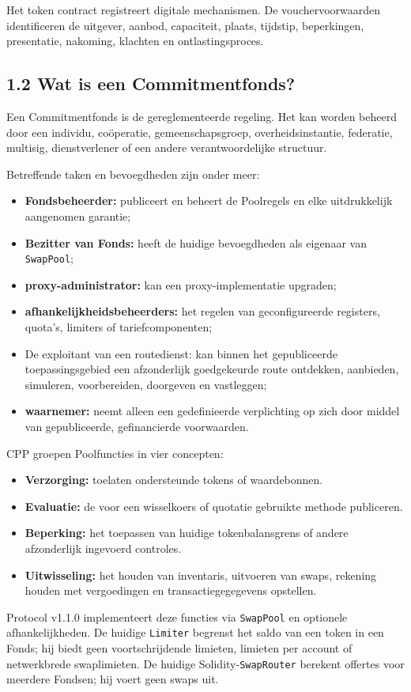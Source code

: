 \documentclass[11pt]{article}
\begin{document}
Het token contract registreert digitale mechanismen. De vouchervoorwaarden identificeren de uitgever, aanbod, capaciteit, plaats, tijdstip, beperkingen, presentatie, nakoming, klachten en ontlastingsproces.

\subsection*{1.2 Wat is een Commitmentfonds?}

Een Commitmentfonds is de gereglementeerde regeling. Het kan worden beheerd door een individu, coöperatie, gemeenschapsgroep, overheidsinstantie, federatie, multisig, dienstverlener of een andere verantwoordelijke structuur.

Betreffende taken en bevoegdheden zijn onder meer:

\begin{itemize}[leftmargin=*]
\item \textbf{Fondsbeheerder:} publiceert en beheert de Poolregels en elke uitdrukkelijk aangenomen garantie;
\item \textbf{Bezitter van Fonds:} heeft de huidige bevoegdheden als eigenaar van \texttt{SwapPool};
\item \textbf{proxy-administrator:} kan een proxy-implementatie upgraden;
\item \textbf{afhankelijkheidsbeheerders:} het regelen van geconfigureerde registers, quota's, limiters of tariefcomponenten;
\item De exploitant van een routedienst: kan binnen het gepubliceerde toepassingsgebied een afzonderlijk goedgekeurde route ontdekken, aanbieden, simuleren, voorbereiden, doorgeven en vastleggen;
\item \textbf{waarnemer:} neemt alleen een gedefinieerde verplichting op zich door middel van gepubliceerde, gefinancierde voorwaarden.
\end{itemize}
CPP groepen Poolfuncties in vier concepten:

\begin{itemize}[leftmargin=*]
\item \textbf{Verzorging:} toelaten ondersteunde tokens of waardebonnen.
\item \textbf{Evaluatie:} de voor een wisselkoers of quotatie gebruikte methode publiceren.
\item \textbf{Beperking:} het toepassen van huidige tokenbalansgrens of andere afzonderlijk ingevoerd controles.
\item \textbf{Uitwisseling:} het houden van inventaris, uitvoeren van swaps, rekening houden met vergoedingen en transactiegegegevens opstellen.
\end{itemize}
Protocol v1.1.0 implementeert deze functies via \texttt{SwapPool} en optionele afhankelijkheden. De huidige \texttt{Limiter} begrenst het saldo van een token in een Fonds; hij biedt geen voortschrijdende limieten, limieten per account of netwerkbrede swaplimieten. De huidige Solidity-\texttt{SwapRouter} berekent offertes voor meerdere Fondsen; hij voert geen swaps uit.
\end{document}
